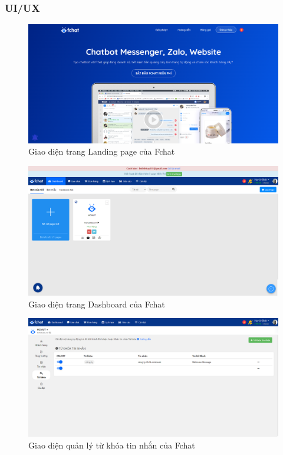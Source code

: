 \subsubsection{UI/UX}
\begin{figure}[H]
    \centering
    \includegraphics[width=1\linewidth]{Images/landingfchat.png}
    \vspace{0.5cm}
    \caption{Giao diện trang Landing page của Fchat}
    \label{fig:enter-label}
\end{figure}
\begin{figure}[H]
    \centering
    \includegraphics[width=1\linewidth]{Images/fchatdashboard.png}
    \vspace{0.5cm}
    \caption{Giao diện trang Dashboard của Fchat}
    \label{fig:enter-label}
\end{figure}
\begin{figure}[H]
    \centering
    \includegraphics[width=1\linewidth]{Images/tukhoafchat.png}
    \vspace{0.5cm}
    \caption{Giao diện quản lý từ khóa tin nhắn của Fchat}
    \label{fig:enter-label}
\end{figure}
